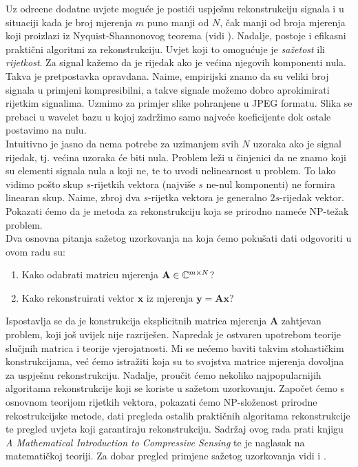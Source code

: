 \documentclass[a4paper,twoside,12pt]{memoir} %
\newcommand{\vect}[1]{\mathbf{#1}}
\renewcommand{\vec}{\vect}
\begin{document}
\begin{intro}
    Uz odre\dj ene dodatne uvjete mogu\'ce je posti\'ci uspje\v{s}nu rekonstrukciju signala i u situaciji kada je broj mjerenja $m$ puno manji od $N$, \v{c}ak manji od broja mjerenja koji proizlazi iz Nyquist-Shannonovog teorema (vidi \cite{radar}). Nadalje, postoje i efikasni prakti\v{c}ni algoritmi za rekonstrukciju. Uvjet koji to omogu\'{c}uje je \textit{sa\v{z}etost} ili \textit{rijetkost}. Za signal ka\v{z}emo da je rijedak ako je ve\'cina njegovih komponenti nula. Takva je pretpostavka opravdana. Naime, empirijski znamo da su veliki broj signala u primjeni kompresibilni, a takve signale mo\v{z}emo dobro aprokimirati rijetkim signalima. Uzmimo za primjer slike pohranjene u JPEG formatu. Slika se prebaci u wavelet bazu u kojoj zadr\v{z}imo samo najve\'ce koeficijente dok ostale postavimo na nulu.\\
    \indent
    Intuitivno je jasno da nema potrebe za uzimanjem svih $N$ uzoraka ako je signal rijedak, tj. ve\'cina uzoraka \'ce biti nula. Problem le\v{z}i u \v{c}injenici da ne znamo koji su elementi signala nula a koji ne, te to uvodi nelinearnost u problem. To lako vidimo po\v{s}to skup $s$-rijetkih vektora (najvi\v{s}e $s$ ne-nul komponenti) ne formira linearan skup. Naime, zbroj dva $s$-rijetka vektora je generalno $2s$-rijedak vektor. Pokazati \'cemo da je metoda za rekonstrukciju koja se prirodno name\'ce NP-te\v{z}ak problem. \\
    \indent
    Dva osnovna pitanja sa\v{z}etog uzorkovanja na koja \'cemo poku\v{s}ati dati odgovoriti u ovom radu su:
    \begin{enumerate}
        \item Kako odabrati matricu mjerenja $\vec A \in \C^{m \times N}$? 
        \item Kako rekonstruirati vektor $\vec x$ iz mjerenja $ \vec y = \vec{Ax}$?
    \end{enumerate}
    Ispostavlja se da je konstrukcija eksplicitnih matrica mjerenja $\vec A$ zahtjevan problem, koji jo\v{s} uvijek nije razrije\v{s}en. Napredak je ostvaren upotrebom teorije slu\v{c}jnih matrica i teorije vjerojatnosti. Mi se ne\'cemo baviti takvim stohasti\v{c}kim konstrukcijama, ve\'c \'cemo istra\v{z}iti koja su to svojstva matrice mjerenja dovoljna za uspje\v{s}nu rekonstrukciju. Nadalje, prou\v{c}it \'cemo nekoliko najpopularnijih algoritama rekonstrukcije koji se koriste u sa\v{z}etom uzorkovanju. Zapo\v{c}et \'cemo s osnovnom teorijom rijetkih vektora, pokazati \'cemo NP-slo\v{z}enost prirodne rekostrukcijske metode, dati pregleda ostalih prakti\v{c}nih algoritama rekonstrukcije te pregled uvjeta koji garantiraju rekonstrukciju. Sadr\v{z}aj ovog rada prati knjigu \textit{A Mathematical Introduction to Compressive Sensing} \cite{foucart13} te je naglasak na matemati\v{c}koj teoriji. Za dobar pregled primjene sa\v{z}etog uzorkovanja vidi \cite{primjene} i \cite{tao}.

\end{intro}
\end{document}
